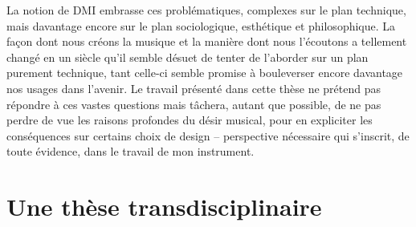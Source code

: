 \indent La notion de \gls{DMI} embrasse ces problématiques, complexes sur le plan technique, mais davantage encore sur le plan sociologique, esthétique et philosophique. La façon dont nous créons la musique et la manière dont nous l’écoutons a tellement changé en un siècle qu’il semble désuet de tenter de l’aborder sur un plan purement technique, tant celle-ci semble promise à bouleverser encore davantage nos usages dans l’avenir. Le travail présenté dans cette thèse ne prétend pas répondre à ces vastes questions mais tâchera, autant que possible, de ne pas perdre de vue les raisons profondes du désir musical, pour en expliciter les conséquences sur certains choix de design -- perspective nécessaire qui s'inscrit, de toute évidence, dans le travail de mon instrument.

\section{Une thèse transdisciplinaire}

